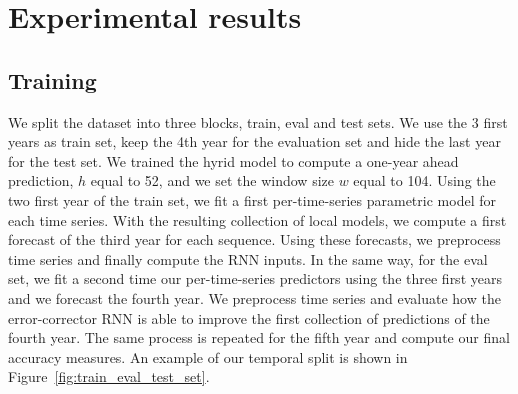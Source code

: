 \documentclass{article} %
\newcommand{\lag}{h}
\newcommand{\window}{w}
\begin{document}
\section{Experimental results}
\label{sec:exp}

\subsection{Training}

We split the dataset into three blocks, train, eval and test sets. We use the 3 first years as train set, keep the 4th year for the evaluation set and hide the last year for the test set. We trained the hyrid model to compute a one-year ahead prediction, $\lag$ equal to 52, and we set the window size $\window$ equal to 104.
Using the two first year of the train set, we fit a first per-time-series parametric model for each time series. With the resulting collection of local models, we compute a first forecast of the third year for each sequence. Using these forecasts, we preprocess  time series and finally compute the RNN inputs. In the same way, for the eval set, we fit a second time our per-time-series predictors using the three first years and we forecast the fourth year. We preprocess time series and evaluate how the error-corrector RNN is able to improve the first collection of predictions of the fourth year. The same process is repeated for the fifth year and compute our final accuracy measures. An example of our temporal split is shown in  Figure~\ref{fig:train_eval_test_set}.

\end{document}
